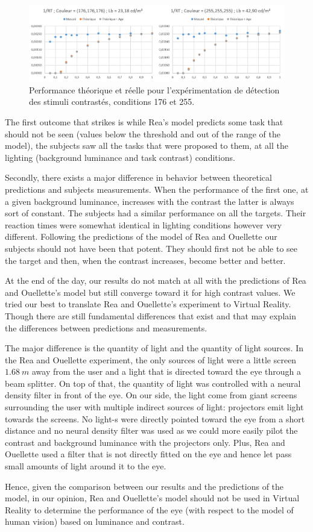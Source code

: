 	\begin{figure}
		\centering
		\includegraphics[width=\linewidth]{Figures/ResultsRVP_3}
		\caption{Performance théorique et réelle pour l'expérimentation de détection des stimuli contrastés, conditions 176 et 255.}
		\label{fig:results_rvp_3}
	\end{figure}

	\par The first outcome that strikes is while Rea's model predicts some task that should not be seen (values below the threshold and out of the range of the model), the subjects saw all the tasks that were proposed to them, at all the lighting (background luminance and task contrast) conditions.

	\par Secondly, there exists a major difference in behavior between theoretical predictions and subjects measurements. When the performance of the first one, at a given background luminance, increases with the contrast the latter is always sort of constant. The subjects had a similar performance on all the targets. Their reaction times were somewhat identical in lighting conditions however very different. Following the predictions of the model of Rea and Ouellette our subjects should not have been that potent. They should first not be able to see the target and then, when the contrast increases, become better and better.

	\par At the end of the day, our results do not match at all with the predictions of Rea and Ouellette's model but still converge toward it for high contrast values. We tried our best to translate Rea and Ouellette's experiment to Virtual Reality. Though there are still fundamental differences that exist and that may explain the differences between predictions and measurements.

	\par The major difference is the quantity of light and the quantity of light sources. In the Rea and Ouellette experiment, the only sources of light were a little screen $1.68~m$ away from the user and a light that is directed toward the eye through a beam splitter. On top of that, the quantity of light was controlled with a neural density filter in front of the eye. On our side, the light come from giant screens surrounding the user with multiple indirect sources of light: projectors emit light towards the screens. No light-s were directly pointed toward the eye from a short distance and no neural density filter was used as we could more easily pilot the contrast and background luminance with the projectors only. Plus, Rea and Ouellette used a filter that is not directly fitted on the eye and hence let pass small amounts of light around it to the eye. 

	\par Hence, given the comparison between our results and the predictions of the model, in our opinion, Rea and Ouellette's model should not be used in Virtual Reality to determine the performance of the eye (with respect to the model of human vision) based on luminance and contrast.